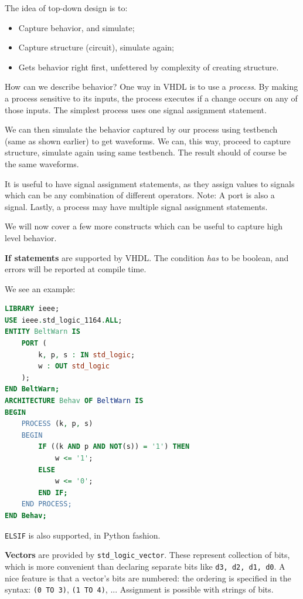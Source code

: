 \documentclass[a4paper,11pt]{article}
\begin{document}
The idea of top-down design is to:
\begin{itemize}
	\item Capture behavior, and simulate;
	\item Capture structure (circuit), simulate again;
	\item Gets behavior right first, unfettered by complexity of creating structure.
\end{itemize}

How can we describe behavior? One way in VHDL is to use a \textit{process}.
By making a process sensitive to its inputs, the process executes if a change occurs on any of those inputs.
The simplest process uses one signal assignment statement.

We can then simulate the behavior captured by our process using testbench (same as shown earlier) to get waveforms.
We can, this way, proceed to capture structure, simulate again using same testbench.
The result should of course be the same waveforms.

It is useful to have signal assignment statements, as they assign values to signals which can be any combination of different operators.
Note: A port is also a signal.
Lastly, a process may have multiple signal assignment statements.

We will now cover a few more constructs which can be useful to capture high level behavior.

\textbf{\textsf{If statements}} are supported by VHDL. The condition \textit{has} to be boolean, and errors will be reported at compile time.

We see an example:
\begin{lstlisting}[language=VHDL, style=codestyle]	
LIBRARY ieee;
USE ieee.std_logic_1164.ALL;
ENTITY BeltWarn IS
	PORT (
		k, p, s : IN std_logic;
		w : OUT std_logic
	);
END BeltWarn;
ARCHITECTURE Behav OF BeltWarn IS
BEGIN
	PROCESS (k, p, s)
	BEGIN
		IF ((k AND p AND NOT(s)) = '1') THEN
			w <= '1';
		ELSE
			w <= '0';
		END IF;
	END PROCESS;
END Behav;
\end{lstlisting}

\texttt{ELSIF} is also supported, in Python fashion.

\textbf{\textsf{Vectors}} are provided by \texttt{std\_logic\_vector}.
These represent collection of bits, which is more convenient than declaring separate bits like \texttt{d3, d2, d1, d0}.
A nice feature is that a vector's bits are numbered: the ordering is specified in the syntax: \texttt{(0 TO 3)}, \texttt{(1 TO 4)}, ...
Assignment is possible with strings of bits.
\end{document}
